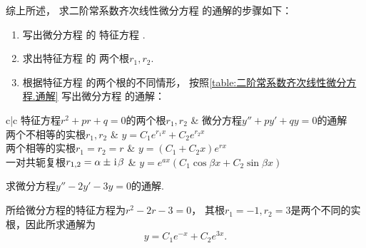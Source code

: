 综上所述，
求二阶常系数齐次线性微分方程  的通解的步骤如下：
\begin{enumerate}
	\item
	写出微分方程  的
	特征方程 .

	\item
	求出特征方程  的
	两个根\(r_1,r_2\).

	\item
	根据特征方程  的两个根的不同情形，
	按照\cref{table:二阶常系数齐次线性微分方程.通解}
	写出微分方程  的通解：
\end{enumerate}

\begin{table}[htb]
	\centering
	\begin{tblr}{c|c}
		\hline
		特征方程\(r^2+pr+q=0\)的两个根\(r_1,r_2\)
			& 微分方程\(y''+py'+qy = 0\)的通解 \\ \hline
		两个不相等的实根\(r_1,r_2\)
			& \(y = C_1 e^{r_1 x} + C_2 e^{r_2 x}\) \\
		两个相等的实根\(r_1=r_2=r\)
			& \(y = (C_1 + C_2 x) e^{r x}\) \\
		一对共轭复根\(r_{1,2}=\alpha\pm\kern1pt\mathrm{i}\kern1pt\beta\)
			& \(y = e^{ax} (C_1 \cos{\beta x} + C_2 \sin{\beta x})\) \\ \hline
	\end{tblr}
	\caption{}
	\label{table:二阶常系数齐次线性微分方程.通解}
\end{table}

\begin{example}
求微分方程\(y'' - 2y' - 3y = 0\)的通解.
\begin{solution}
所给微分方程的特征方程为\(r^2-2r-3=0\)，
其根\(r_1=-1, r_2=3\)是两个不同的实根，因此所求通解为\begin{equation*}
	y = C_1 e^{-x} + C_2 e^{3x}.
\end{equation*}
\end{solution}
\end{example}

